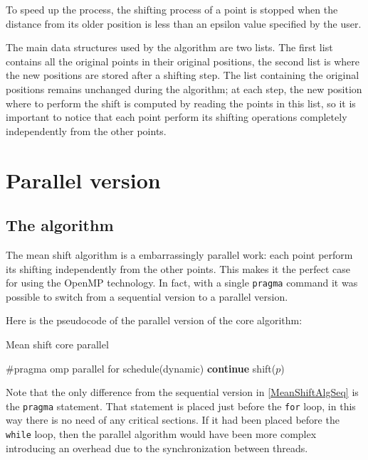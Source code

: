 \documentclass[10pt,twocolumn,letterpaper]{article}
\begin{document}
To speed up the process, the shifting process of a point is stopped when the distance from its older position is less than an epsilon value specified by the user.

The main data structures used by the algorithm are two lists. The first list contains all the original points in their original positions, the second list is where the new positions are stored after a shifting step. The list containing the original positions remains unchanged during the algorithm; at each step, the new position where to perform the shift is computed by reading the points in this list, so it is important to notice that each point perform its shifting operations completely independently from the other points.

\section{Parallel version}

\subsection{The algorithm}

The mean shift algorithm is a embarrassingly parallel work: each point perform its shifting independently from the other points. This makes it the perfect case for using the OpenMP technology. In fact, with a single \verb"pragma" command it was possible to switch from a sequential version to a parallel version.

Here is the pseudocode of the parallel version of the core algorithm:

\begin{algorithm}
\label{MeanShiftAlgPar}
\caption{Mean shift core parallel}
\begin{algorithmic}

        \State \#pragma omp parallel for schedule(dynamic)
                    \State \textbf{continue}
                \EndIf
            \State shift($p$)
            \EndFor
    \EndWhile

\end{algorithmic}
\end{algorithm}

Note that the only difference from the sequential version in \ref{MeanShiftAlgSeq} is the \verb"pragma" statement. That statement is placed just before the \verb"for" loop, in this way there is no need of any critical sections. If it had been placed before the \verb"while" loop, then the parallel algorithm would have been more complex introducing an overhead due to the synchronization between threads.
\end{document}
